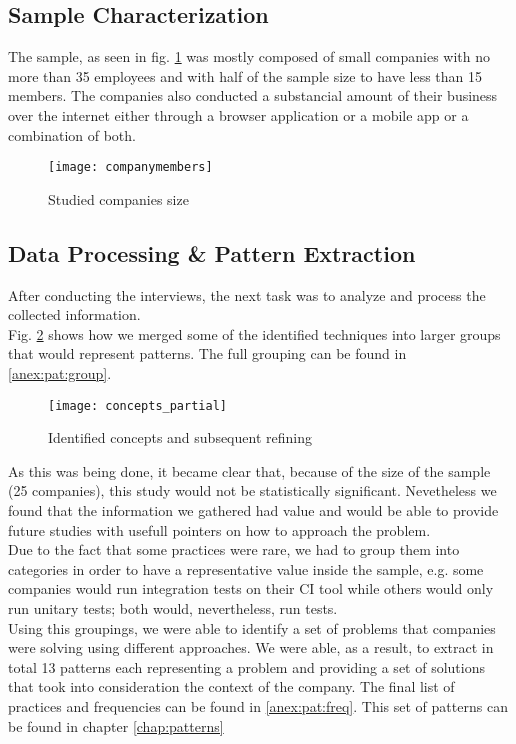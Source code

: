       \subsection{Sample Characterization}
      The sample, as seen in fig. \ref{fig:companymembers} was mostly composed of small companies with no more than 35 employees and with half of the sample size to have less than 15 members. The companies also conducted a substancial amount of their business over the internet either through a browser application or a mobile app or a combination of both.
      \begin{figure}
        \texttt{[image: companymembers]}
        \caption{Studied companies size}
        \label{fig:companymembers}
      \end{figure}

      \subsection{Data Processing \& Pattern Extraction}
      After conducting the interviews, the next task was to analyze and process the collected information.\\
      Fig. \ref{fig:concepts} shows how we merged some of the identified techniques into larger groups that would represent patterns. The full grouping can be found in \ref{anex:pat:group}.\\
      \begin{figure}
        \centering
        \texttt{[image: concepts\_partial]}
        \caption{Identified concepts and subsequent refining}
        \label{fig:concepts}
      \end{figure}
      As this was being done, it became clear that, because of the size of the sample (25 companies), this study would not be statistically significant. Nevetheless we found that the information we gathered had value and would be able to provide future studies with usefull pointers on how to approach the problem.\\
       Due to the fact that some practices were rare, we had to group them into categories in order to have a representative value inside the sample, e.g. some companies would run integration tests on their CI tool while others would only run unitary tests; both would, nevertheless, run tests. \\
      Using this groupings, we were able to identify a set of problems that companies were solving using different approaches. We were able, as a result, to extract in total 13 patterns each representing a problem and providing a set of solutions that took into consideration the context of the company. The final list of practices and frequencies can be found in \ref{anex:pat:freq}.
      This set of patterns can be found in chapter \ref{chap:patterns}

